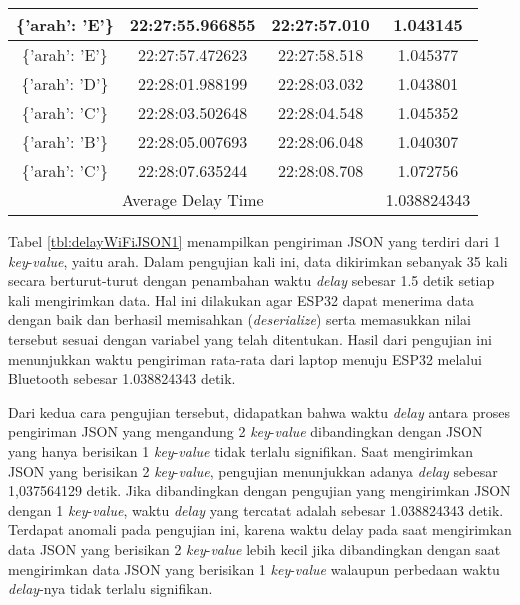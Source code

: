 \begin{longtable}{|ccc|c|}
    \multicolumn{1}{|c|}{\{'arah': 'E'\}} & \multicolumn{1}{c|}{22:27:55.966855} & 22:27:57.010       & 1.043145    \\ \hline
    \multicolumn{1}{|c|}{\{'arah': 'E'\}} & \multicolumn{1}{c|}{22:27:57.472623} & 22:27:58.518       & 1.045377    \\ \hline
    \multicolumn{1}{|c|}{\{'arah': 'D'\}} & \multicolumn{1}{c|}{22:28:01.988199} & 22:28:03.032       & 1.043801    \\ \hline
    \multicolumn{1}{|c|}{\{'arah': 'C'\}} & \multicolumn{1}{c|}{22:28:03.502648} & 22:28:04.548       & 1.045352    \\ \hline
    \multicolumn{1}{|c|}{\{'arah': 'B'\}} & \multicolumn{1}{c|}{22:28:05.007693} & 22:28:06.048       & 1.040307    \\ \hline
    \multicolumn{1}{|c|}{\{'arah': 'C'\}} & \multicolumn{1}{c|}{22:28:07.635244} & 22:28:08.708       & 1.072756    \\ \hline
    \multicolumn{3}{|c|}{Average Delay Time}                                                          & 1.038824343 \\ \hline
\end{longtable}

Tabel \ref{tbl:delayWiFiJSON1} menampilkan pengiriman JSON yang terdiri dari 1 \emph{key}-\emph{value}, yaitu arah. Dalam pengujian kali ini, data dikirimkan sebanyak 35 kali secara berturut-turut dengan penambahan waktu \emph{delay} sebesar 1.5 detik setiap kali mengirimkan data. Hal ini dilakukan agar ESP32 dapat menerima data dengan baik dan berhasil memisahkan (\emph{deserialize}) serta memasukkan nilai tersebut sesuai dengan variabel yang telah ditentukan. Hasil dari pengujian ini menunjukkan waktu pengiriman rata-rata dari laptop menuju ESP32 melalui Bluetooth sebesar 1.038824343 detik.

Dari kedua cara pengujian tersebut, didapatkan bahwa waktu \emph{delay} antara proses pengiriman JSON yang mengandung 2 \emph{key}-\emph{value} dibandingkan dengan JSON yang hanya berisikan 1 \emph{key}-\emph{value} tidak terlalu signifikan. Saat mengirimkan JSON yang berisikan 2 \emph{key}-\emph{value}, pengujian menunjukkan adanya \emph{delay} sebesar 1,037564129 detik. Jika dibandingkan dengan pengujian yang mengirimkan JSON dengan 1 \emph{key}-\emph{value}, waktu \emph{delay} yang tercatat adalah sebesar 1.038824343 detik. Terdapat anomali pada pengujian ini, karena waktu delay pada saat mengirimkan data JSON yang berisikan 2 \emph{key}-\emph{value} lebih kecil jika dibandingkan dengan saat mengirimkan data JSON yang berisikan 1 \emph{key}-\emph{value} walaupun perbedaan waktu \emph{delay}-nya tidak terlalu signifikan.